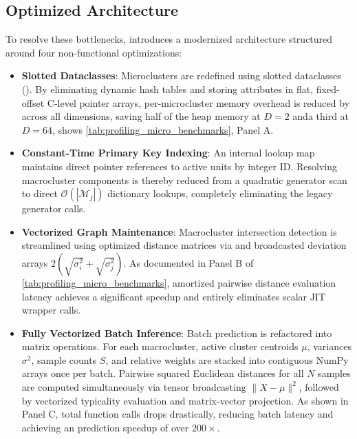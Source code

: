 \subsection{Optimized Architecture}

To resolve these bottlenecks,  introduces a modernized architecture structured around four non-functional optimizations:

\begin{itemize}
    \item \textbf{Slotted Dataclasses}: Microclusters are redefined using slotted dataclasses (). By eliminating dynamic hash tables and storing attributes in flat, fixed-offset C-level pointer arrays, per-microcluster memory overhead is reduced by across all dimensions, saving half of the heap memory at $D=2$ anda third at $D=64$, shows \cref{tab:profiling_micro_benchmarks}, Panel A.

    \item \textbf{Constant-Time Primary Key Indexing}: An internal lookup map  maintains direct pointer references to active units by integer ID. Resolving macrocluster components is thereby reduced from a quadratic generator scan to direct $\mathcal{O}(|\mathcal{M}_j|)$ dictionary lookups, completely eliminating the legacy  generator calls.

    \item \textbf{Vectorized Graph Maintenance}: Macrocluster intersection detection is streamlined using optimized distance matrices via  and broadcasted deviation arrays $2(\sqrt{\sigma_i^2} + \sqrt{\sigma_j^2})$. As documented in Panel B of \cref{tab:profiling_micro_benchmarks}, amortized pairwise distance evaluation latency achieves a significant speedup and entirely eliminates scalar JIT wrapper calls.

    \item \textbf{Fully Vectorized Batch Inference}: Batch prediction is refactored into matrix operations. For each macrocluster, active cluster centroids $\mu$, variances $\sigma^2$, sample counts $S$, and relative weights are stacked into contiguous NumPy arrays once per batch. Pairwise squared Euclidean distances for all $N$ samples are computed simultaneously via tensor broadcasting $\|X - \mu\|^2$, followed by vectorized typicality evaluation and matrix-vector projection. As shown in Panel C, total function calls drops drastically, reducing batch latency and achieving an prediction speedup of over $200\times$.
\end{itemize}

